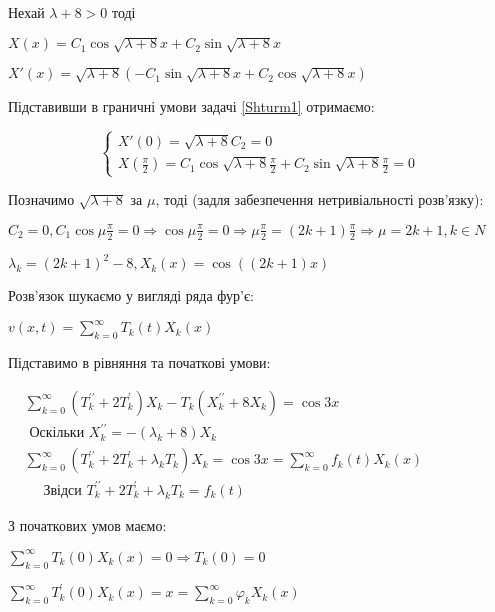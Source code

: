 \begin{center}
    Нехай $ \lambda + 8 > 0 $ тоді 


    $ X(x)= C_1 \cos{\sqrt{\lambda + 8} x} + C_2 \sin{\sqrt{\lambda + 8} x} $


    $ X'(x)= \sqrt{\lambda + 8}(-C_1 \sin{\sqrt{\lambda + 8} x} + C_2 \cos{\sqrt{\lambda + 8} x}) $


    Підставивши в граничні умови задачі \ref{Shturm1} отримаємо:


    \begin{equation}
        \begin{cases}
            X'(0) = \sqrt{\lambda + 8} C_2 = 0 \\
            X(\frac{\pi}{2}) = C_1 \cos{\sqrt{\lambda + 8}\frac{\pi}{2}} + C_2 \sin{\sqrt{\lambda + 8}\frac{\pi}{2}} = 0
        \end{cases}
    \end{equation}


    Позначимо $ \sqrt{\lambda + 8} $ за $ \mu $, тоді (задля забезпечення нетривіальності розв'язку):


    $ C_2 = 0, C_1 \cos{\mu \frac{\pi}{2}} = 0 \Rightarrow \cos{\mu \frac{\pi}{2}} = 0 \Rightarrow \mu \frac{\pi}{2} = (2k + 1) \frac{\pi}{2} \Rightarrow \mu = 2k + 1, k \in N $
    

    $ \lambda_k = (2k + 1)^2 - 8, X_k(x) = \cos{((2k + 1)x)} $


    Розв'язок шукаємо у вигляді ряда фур'є:


    $ v(x, t)=\sum_{k=0}^{\infty} T_k(t) X_k(x)$


    Підставимо в рівняння та початкові умови:

    $\begin{aligned} & \sum_{k=0}^{\infty}\left(T_k^{\prime \prime}+2 T_k^{\prime}\right) X_k-T_k\left(X_k^{\prime \prime}+8 X_k\right)=\cos 3 x \\ & \text { Оскільки } X_k^{\prime \prime}=-\left(\lambda_k+8\right) X_k \\ & \sum_{k=0}^{\infty}\left(T_k^{\prime \prime}+2 T_k^{\prime}+\lambda_k T_k\right) X_k=\cos 3 x=\sum_{k=0}^{\infty} f_k(t) X_k(x) \\ & \quad \text { Звідси } T_k^{\prime \prime}+2 T_k^{\prime}+\lambda_k T_k=f_k(t)\end{aligned}$


    З початкових умов маємо: 


    $\sum_{k=0}^{\infty} T_k(0) X_k(x)=0 \Rightarrow T_k(0)=0  $

    $\sum_{k=0}^{\infty} T_k^{\prime}(0) X_k(x) = x = \sum_{k=0}^{\infty} \varphi_k X_{k}(x)$



\end{center}
